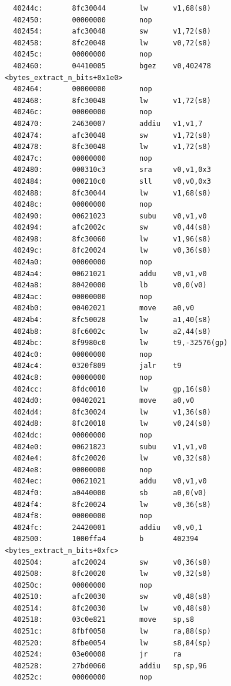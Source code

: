 \documentclass[11pt]{article}
\begin{document}
\begin{verbatim}
  40244c:       8fc30044        lw      v1,68(s8)
  402450:       00000000        nop
  402454:       afc30048        sw      v1,72(s8)
  402458:       8fc20048        lw      v0,72(s8)
  40245c:       00000000        nop
  402460:       04410005        bgez    v0,402478 <bytes_extract_n_bits+0x1e0>
  402464:       00000000        nop
  402468:       8fc30048        lw      v1,72(s8)
  40246c:       00000000        nop
  402470:       24630007        addiu   v1,v1,7
  402474:       afc30048        sw      v1,72(s8)
  402478:       8fc30048        lw      v1,72(s8)
  40247c:       00000000        nop
  402480:       000310c3        sra     v0,v1,0x3
  402484:       000210c0        sll     v0,v0,0x3
  402488:       8fc30044        lw      v1,68(s8)
  40248c:       00000000        nop
  402490:       00621023        subu    v0,v1,v0
  402494:       afc2002c        sw      v0,44(s8)
  402498:       8fc30060        lw      v1,96(s8)
  40249c:       8fc20024        lw      v0,36(s8)
  4024a0:       00000000        nop
  4024a4:       00621021        addu    v0,v1,v0
  4024a8:       80420000        lb      v0,0(v0)
  4024ac:       00000000        nop
  4024b0:       00402021        move    a0,v0
  4024b4:       8fc50028        lw      a1,40(s8)
  4024b8:       8fc6002c        lw      a2,44(s8)
  4024bc:       8f9980c0        lw      t9,-32576(gp)
  4024c0:       00000000        nop
  4024c4:       0320f809        jalr    t9
  4024c8:       00000000        nop
  4024cc:       8fdc0010        lw      gp,16(s8)
  4024d0:       00402021        move    a0,v0
  4024d4:       8fc30024        lw      v1,36(s8)
  4024d8:       8fc20018        lw      v0,24(s8)
  4024dc:       00000000        nop
  4024e0:       00621823        subu    v1,v1,v0
  4024e4:       8fc20020        lw      v0,32(s8)
  4024e8:       00000000        nop
  4024ec:       00621021        addu    v0,v1,v0
  4024f0:       a0440000        sb      a0,0(v0)
  4024f4:       8fc20024        lw      v0,36(s8)
  4024f8:       00000000        nop
  4024fc:       24420001        addiu   v0,v0,1
  402500:       1000ffa4        b       402394 <bytes_extract_n_bits+0xfc>
  402504:       afc20024        sw      v0,36(s8)
  402508:       8fc20020        lw      v0,32(s8)
  40250c:       00000000        nop
  402510:       afc20030        sw      v0,48(s8)
  402514:       8fc20030        lw      v0,48(s8)
  402518:       03c0e821        move    sp,s8
  40251c:       8fbf0058        lw      ra,88(sp)
  402520:       8fbe0054        lw      s8,84(sp)
  402524:       03e00008        jr      ra
  402528:       27bd0060        addiu   sp,sp,96
  40252c:       00000000        nop


\end{verbatim}
\end{document}
